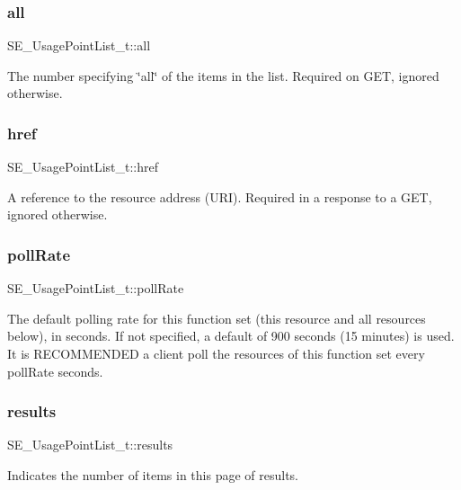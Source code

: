 \subsubsection{\texorpdfstring{all}{all}}
{\footnotesize\ttfamily S\+E\+\_\+\+Usage\+Point\+List\+\_\+t\+::all}

The number specifying \char`\"{}all\char`\"{} of the items in the list. Required on G\+ET, ignored otherwise. \mbox{\label{group__UsagePointList_ga50a5a203dfb3fa45bd6f2aa6c8969789}} 
\subsubsection{\texorpdfstring{href}{href}}
{\footnotesize\ttfamily S\+E\+\_\+\+Usage\+Point\+List\+\_\+t\+::href}

A reference to the resource address (U\+RI). Required in a response to a G\+ET, ignored otherwise. \mbox{\label{group__UsagePointList_ga7f423f1fa17d9cadd34cae85acce3484}} 
\subsubsection{\texorpdfstring{poll\+Rate}{pollRate}}
{\footnotesize\ttfamily S\+E\+\_\+\+Usage\+Point\+List\+\_\+t\+::poll\+Rate}

The default polling rate for this function set (this resource and all resources below), in seconds. If not specified, a default of 900 seconds (15 minutes) is used. It is R\+E\+C\+O\+M\+M\+E\+N\+D\+ED a client poll the resources of this function set every poll\+Rate seconds. \mbox{\label{group__UsagePointList_gaa6b306a7e5ad0fdae577e81dc496c2e3}} 
\subsubsection{\texorpdfstring{results}{results}}
{\footnotesize\ttfamily S\+E\+\_\+\+Usage\+Point\+List\+\_\+t\+::results}

Indicates the number of items in this page of results. \mbox{\label{group__UsagePointList_ga801cb7a2df80a375d5bd610359add3a9}} 
